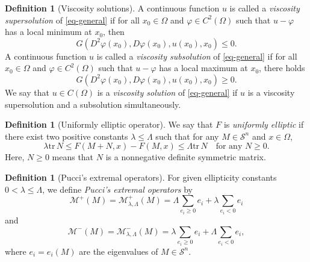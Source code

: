 \documentclass[11pt]{amsart}
\theoremstyle{plain}
\theoremstyle{definition}
\newtheorem{definition}[theorem]{Definition}
\numberwithin{equation}{section}
\begin{document}
\begin{definition}[Viscosity solutions]
	A continuous function $u$ is called a \textit{viscosity supersolution} of \eqref{eq-general} if for all $x_0\in \Omega$ and $\varphi\in C^{2}(\Omega)$ such that $u-\varphi$ has a local minimum at $x_0$, then 
	\begin{equation*}
		G(D^{2}\varphi(x_0), D\varphi(x_0), u(x_0), x_0)\leq 0.
	\end{equation*}
	A continuous function $u$ is called a \textit{viscosity subsolution} of \eqref{eq-general} if for all $x_0\in \Omega$ and $\varphi\in C^{2}(\Omega)$ such that $u-\varphi$ has a local maximum at $x_0$, there holds 
	\begin{equation*}
		G(D^{2}\varphi(x_0), D\varphi(x_0), u(x_0), x_0)\geq 0.
	\end{equation*}
	We say that $u\in C(\Omega)$ is a \textit{viscosity solution} of \eqref{eq-general} if $u$ is a viscosity supersolution and a subsolution simultaneously.
\end{definition}

\begin{definition}[Uniformly elliptic operator]
    We say that $F$ is \emph{uniformly elliptic} if there exist two positive constants $\lambda \leq \Lambda$ such that for any $M \in \mathcal{S}^n$ and $x \in \Omega$,
    \begin{equation*}
        \lambda \mathrm{tr}\,N \leq F(M+N, x)-F(M, x) \leq \Lambda \mathrm{tr}\,N  \quad \text{for any $N \geq 0$}.
    \end{equation*}
    Here, $N \geq 0$ means that $N$ is a nonnegative definite symmetric matrix.
\end{definition}

\begin{definition}[Pucci's extremal operators]\label{def-pucci}
    For given ellipticity constants $0<\lambda \leq \Lambda$, we define \emph{Pucci's extremal operators} by
    \begin{equation*}
        \mathcal{M}^+(M)=\mathcal{M}_{\lambda, \Lambda}^+(M)=\Lambda\sum_{e_i \geq 0}e_i+\lambda \sum_{e_i<0}e_i
    \end{equation*}
    and
     \begin{equation*}
        \mathcal{M}^-(M)=\mathcal{M}_{\lambda, \Lambda}^-(M)=\lambda\sum_{e_i \geq 0}e_i+\Lambda \sum_{e_i<0}e_i,
    \end{equation*}
    where $e_i=e_i(M)$ are the eigenvalues of $M \in \mathcal{S}^n$. 
\end{definition}
\end{document}
